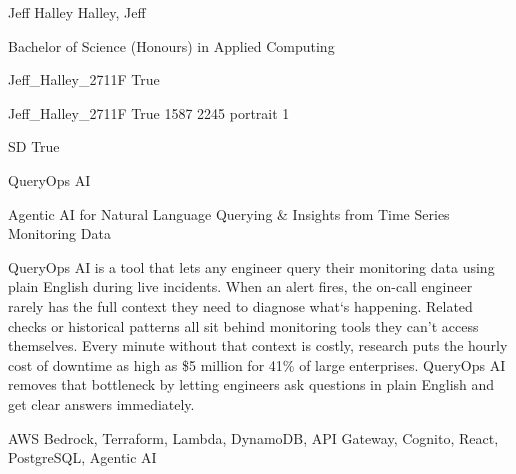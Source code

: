 \documentclass[twoside]{report}
\begin{document}
\begingroup{}\relax



\def\Key{Jeff_Halley_2711F}

{Jeff Halley}
{Halley, Jeff}

{Bachelor of Science (Honours) in Applied Computing}

{Jeff_Halley_2711F}
{True}

{Jeff_Halley_2711F}
{True}
{1587}
{2245}
{portrait}
{1}

{SD}
{True}

{QueryOps AI}

{Agentic AI for Natural Language Querying \& Insights from Time Series Monitoring Data}

{QueryOps AI is a tool that lets any engineer query their monitoring data using plain English during live incidents. When an alert fires, the on-call engineer rarely has the full context they need to diagnose what\textquoteleft{}s happening. Related checks or historical patterns all sit behind monitoring tools they can\textquoteright{}t access themselves. Every minute without that context is costly, research puts the hourly cost of downtime as high as \$5 million for 41\% of large enterprises. QueryOps AI removes that bottleneck by letting engineers ask questions in plain English and get clear answers immediately.}

{AWS Bedrock, Terraform, Lambda, DynamoDB, API Gateway, Cognito, React, PostgreSQL, Agentic AI}
\end{document}
